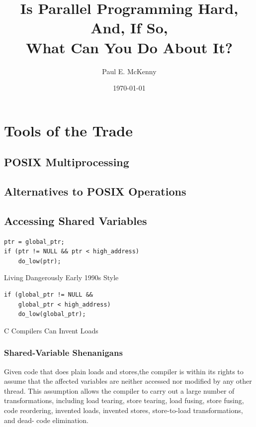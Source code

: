 \documentclass[11pt]{article}
\author{Paul E. McKenny}
\date{\today}
\title{Is Parallel Programming Hard, And, If So, \\What Can You Do About It?}
\begin{document}
\maketitle
\tableofcontents

\section{Tools of the Trade}
\label{sec:org3bfd19b}
\subsection{POSIX Multiprocessing}
\label{sec:org24bb7d1}
\subsection{Alternatives to POSIX Operations}
\label{sec:org72ed6ef}
\subsection{Accessing Shared Variables}
\label{sec:org89e5972}
\begin{listing}[htbp]
\begin{verbatim}
ptr = global_ptr;
if (ptr != NULL && ptr < high_address)
    do_low(ptr);
\end{verbatim}
\caption{\label{l4.14}Living Dangerously Early 1990s Style}
\end{listing}

\begin{listing}[htbp]
\begin{verbatim}
if (global_ptr != NULL &&
    global_ptr < high_address)
    do_low(global_ptr);
\end{verbatim}
\caption{\label{l4.15}C Compilers Can Invent Loads}
\end{listing}
\subsubsection{Shared-Variable Shenanigans}
\label{sec:orgb1549c2}
Given code that does plain loads and stores,the compiler is within its rights to assume that the
affected variables are neither accessed nor modified by any other thread. This assumption allows the
compiler to carry out a large number of transformations, including load tearing, store tearing, load
fusing, store fusing, code reordering, invented loads, invented stores, store-to-load transformations,
and dead- code elimination.
\end{document}

